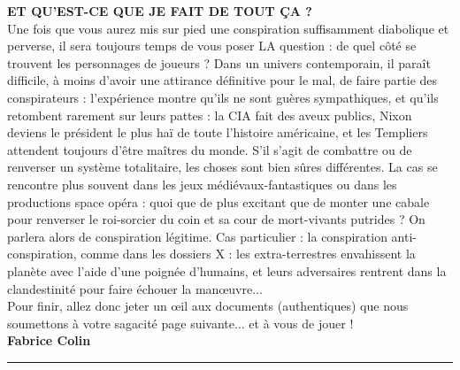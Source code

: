 \documentclass[11pt,twoside,a4paper]{article}
\begin{document}
\begin{multicols*}{2}
\textbf{\large ET QU'EST-CE QUE JE FAIT DE TOUT \c{C}A ?}~\\
Une fois que vous aurez mis sur pied une conspiration suffisamment diabolique et perverse, il sera toujours temps de vous poser LA question : de quel c{\^o}t{\'e} se trouvent les personnages de joueurs ? Dans un univers contemporain, il para{\^i}t difficile, {\`a} moins d'avoir une attirance d{\'e}finitive pour le mal, de faire partie des conspirateurs : l'exp{\'e}rience montre qu'ils ne sont gu{\`e}res sympathiques, et qu'ils retombent rarement sur leurs pattes : la CIA fait des aveux publics, Nixon deviens le pr{\'e}sident le plus ha{\"i} de toute l'histoire am{\'e}ricaine, et les Templiers attendent toujours d'{\^e}tre ma{\^i}tres du monde. S'il s'agit de combattre ou de renverser un syst{\`e}me totalitaire, les choses sont bien s{\^u}res diff{\'e}rentes. La cas se rencontre plus souvent dans les jeux m{\'e}di{\'e}vaux-fantastiques ou dans les productions space op{\'e}ra : quoi que de plus excitant que de monter une cabale pour renverser le roi-sorcier du coin et sa cour de mort-vivants putrides ? On parlera alors de conspiration l{\'e}gitime. Cas particulier : la conspiration anti-conspiration, comme dans les dossiers X : les extra-terrestres envahissent la plan{\`e}te avec l'aide d'une poign{\'e}e d'humains, et leurs adversaires rentrent dans la clandestinit{\'e} pour faire {\'e}chouer la man\oe uvre... ~\\
Pour finir, allez donc jeter un \oe il aux documents (authentiques) que nous soumettons {\`a} votre sagacit{\'e} page suivante... et {\`a} vous de jouer  ! ~\\

\textbf{Fabrice Colin}~\\ %

\vfill
\columnbreak

\begin{center} \rule{0.45\textwidth}{0.01cm} \end{center}
 

\end{multicols*}
\end{document}

